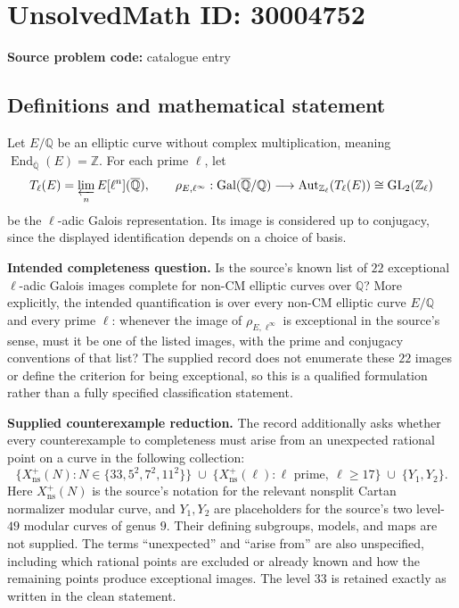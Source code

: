 \documentclass[11pt]{article}
\newcommand{\Z}{\mathbb{Z}}
\newcommand{\Q}{\mathbb{Q}}
\begin{document}
\section*{UnsolvedMath ID: 30004752}
\textbf{Source problem code:} catalogue entry
\subsection{Definitions and mathematical statement}
Let \(E/\Q\) be an elliptic curve without complex multiplication, meaning \(\operatorname{End}_{\overline{\Q}}(E)=\Z\). For each prime \(\ell\), let
\[
T_\ell(E)=\varprojlim_n E[\ell^n](\overline{\Q}),\qquad
\rho_{E,\ell^\infty}:\operatorname{Gal}(\overline{\Q}/\Q)\longrightarrow\operatorname{Aut}_{\Z_\ell}(T_\ell(E))\cong\operatorname{GL}_2(\Z_\ell)
\]
be the \(\ell\)-adic Galois representation. Its image is considered up to conjugacy, since the displayed identification depends on a choice of basis.

\textbf{Intended completeness question.} Is the source's known list of \(22\) exceptional \(\ell\)-adic Galois images complete for non-CM elliptic curves over \(\Q\)? More explicitly, the intended quantification is over every non-CM elliptic curve \(E/\Q\) and every prime \(\ell\): whenever the image of \(\rho_{E,\ell^\infty}\) is exceptional in the source's sense, must it be one of the listed images, with the prime and conjugacy conventions of that list? The supplied record does not enumerate these \(22\) images or define the criterion for being exceptional, so this is a qualified formulation rather than a fully specified classification statement.

\textbf{Supplied counterexample reduction.} The record additionally asks whether every counterexample to completeness must arise from an unexpected rational point on a curve in the following collection:
\[
\bigl\{X_{\mathrm{ns}}^+(N):N\in\{33,5^2,7^2,11^2\}\bigr\}
\;\cup\;
\bigl\{X_{\mathrm{ns}}^+(\ell):\ell\text{ prime},\ \ell\geq17\bigr\}
\;\cup\;\{Y_1,Y_2\}.
\]
Here \(X_{\mathrm{ns}}^+(N)\) is the source's notation for the relevant nonsplit Cartan normalizer modular curve, and \(Y_1,Y_2\) are placeholders for the source's two level-\(49\) modular curves of genus \(9\). Their defining subgroups, models, and maps are not supplied. The terms ``unexpected'' and ``arise from'' are also unspecified, including which rational points are excluded or already known and how the remaining points produce exceptional images. The level \(33\) is retained exactly as written in the clean statement.
\end{document}

